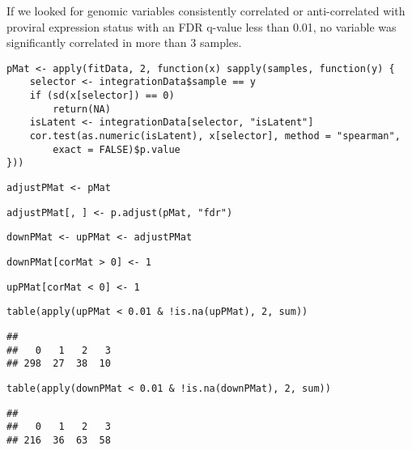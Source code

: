 \documentclass[../../sherrill-Mix_thesis.tex]{subfiles}
\makeatletter
\newenvironment{kframe}{%
 \def\at@end@of@kframe{}%
 \ifinner\ifhmode%
  \def\at@end@of@kframe{\end{minipage}}%
  \begin{minipage}{\columnwidth}%
 \fi\fi%
 \def\FrameCommand##1{\hskip\@totalleftmargin \hskip-\fboxsep
 \colorbox{shadecolor}{##1}\hskip-\fboxsep
     \hskip-\linewidth \hskip-\@totalleftmargin \hskip\columnwidth}%
 \MakeFramed {\advance\hsize-\width
   \@totalleftmargin\z@ \linewidth\hsize
   \@setminipage}}%
 {\par\unskip\endMakeFramed%
 \at@end@of@kframe}
\newenvironment{knitrout}{}{} %
\makeatother
\begin{document}
If we looked for genomic variables consistently correlated or anti-correlated with proviral expression status with an FDR q-value less than 0.01, no variable was significantly correlated in more than 3 samples.
\begin{knitrout}
\color{fgcolor}\begin{kframe}
\begin{lstlisting}[basicstyle=\ttfamily,breaklines=true]
pMat <- apply(fitData, 2, function(x) sapply(samples, function(y) {
    selector <- integrationData$sample == y
    if (sd(x[selector]) == 0) 
        return(NA)
    isLatent <- integrationData[selector, "isLatent"]
    cor.test(as.numeric(isLatent), x[selector], method = "spearman", 
        exact = FALSE)$p.value
}))\end{lstlisting}
\begin{lstlisting}[basicstyle=\ttfamily,breaklines=true]
adjustPMat <- pMat\end{lstlisting}
\begin{lstlisting}[basicstyle=\ttfamily,breaklines=true]
adjustPMat[, ] <- p.adjust(pMat, "fdr")\end{lstlisting}
\begin{lstlisting}[basicstyle=\ttfamily,breaklines=true]
downPMat <- upPMat <- adjustPMat\end{lstlisting}
\begin{lstlisting}[basicstyle=\ttfamily,breaklines=true]
downPMat[corMat > 0] <- 1\end{lstlisting}
\begin{lstlisting}[basicstyle=\ttfamily,breaklines=true]
upPMat[corMat < 0] <- 1\end{lstlisting}
\begin{lstlisting}[basicstyle=\ttfamily,breaklines=true]
table(apply(upPMat < 0.01 & !is.na(upPMat), 2, sum))\end{lstlisting}
\begin{lstlisting}[basicstyle=\ttfamily,breaklines=true]
## 
##   0   1   2   3 
## 298  27  38  10
\end{lstlisting}
\begin{lstlisting}[basicstyle=\ttfamily,breaklines=true]
table(apply(downPMat < 0.01 & !is.na(downPMat), 2, sum))\end{lstlisting}
\begin{lstlisting}[basicstyle=\ttfamily,breaklines=true]
## 
##   0   1   2   3 
## 216  36  63  58
\end{lstlisting}
\end{kframe}
\end{knitrout}
\end{document}
